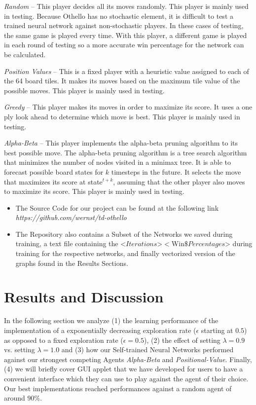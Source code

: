 \documentclass{sig-alternate-05-2015}
\begin{document}
\emph{Random} -- This player decides all its moves randomly. This player is mainly used in testing. Because Othello has no stochastic element, it is difficult to test a trained neural network against non-stochastic players. In these cases of testing, the same game is played every time. With this player, a different game is played in each round of testing so a more accurate win percentage for the network can be calculated.

\emph{Position Values} -- This is a fixed player with a heuristic value assigned to each of the 64 board tiles. It makes its moves based on the maximum tile value of the possible moves. This player is mainly used in testing.

\emph{Greedy} -- This player makes its moves in order to maximize its score. It uses a one ply look ahead to determine which move is best. This player is mainly used in testing.

\emph{Alpha-Beta} -- This player implements the alpha-beta pruning algorithm to its best possible move. The alpha-beta pruning algorithm is a tree search algorithm that minimizes the number of nodes visited in a minimax tree. It is able to forecast possible board states for $k$ timesteps in the future. It selects the move that maximizes its score at state$^{t+k}$, assuming that the other player also moves to maximize its score. This player is mainly used in testing.


\begin{itemize}

\item The Source Code for our project can be found at the following link \emph{https://github.com/wernst/td-othello}
\item The Repository also contains a Subset of the Networks we saved during training, a text file containing the <$Iterations$>$<$Win$ \$Percentages$>  during training for the respective networks, and finally vectorized version of the graphs found in the Results Sections. 

\end{itemize}

\section{Results and Discussion}
	In the following section we analyze (1) the learning performance of the implementation of a exponentially decreasing exploration rate ($\epsilon$ starting at $0.5$) as opposed to a fixed exploration rate ($\epsilon = 0.5$), (2) the effect of setting $\lambda = 0.9$ vs. setting $\lambda = 1.0$ and (3) how our Self-trained Neural Networks performed against our strongest competing Agents \emph{Alpha-Beta} and \emph{Positional-Value}. Finally, (4) we will briefly cover GUI applet that we have developed for users to have a convenient interface which they can use to play against the agent of their choice. Our best implementations reached performances against a random agent of around $90\%$.
\end{document}
